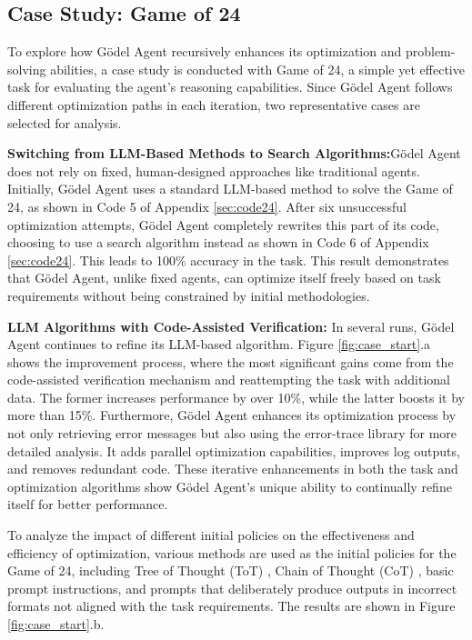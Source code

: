 \documentclass[11pt]{article}
\newcommand{\framework}{Gödel Agent\xspace}
\begin{document}
\subsection{Case Study: Game of 24}
\label{sec:game24}
To explore how \framework recursively enhances its optimization and problem-solving abilities, a case study is conducted with Game of 24, a simple yet effective task for evaluating the agent’s reasoning capabilities. Since \framework follows different optimization paths in each iteration, two representative cases are selected for analysis.



\noindent\textbf{Switching from LLM-Based Methods to Search Algorithms:}\quad \framework does not rely on fixed, human-designed approaches like traditional agents. Initially, \framework uses a standard LLM-based method to solve the Game of 24, as shown in Code 5 of Appendix \ref{sec:code24}. After six unsuccessful optimization attempts, \framework completely rewrites this part of its code, choosing to use a search algorithm instead as shown in Code 6 of Appendix \ref{sec:code24}. This leads to 100\% accuracy in the task. This result demonstrates that \framework, unlike fixed agents, can optimize itself freely based on task requirements without being constrained by initial methodologies.

\noindent\textbf{LLM Algorithms with Code-Assisted Verification:} \quad
In several runs, \framework continues to refine its LLM-based algorithm. Figure \ref{fig:case_start}.a shows the improvement process, where the most significant gains come from the code-assisted verification mechanism and reattempting the task with additional data. The former increases performance by over 10\%, while the latter boosts it by more than 15\%. Furthermore, \framework enhances its optimization process by not only retrieving error messages but also using the error-trace library for more detailed analysis. It adds parallel optimization capabilities, improves log outputs, and removes redundant code. These iterative enhancements in both the task and optimization algorithms show \framework{}’s unique ability to continually refine itself for better performance.

To analyze the impact of different initial policies on the effectiveness and efficiency of optimization, various methods are used as the initial policies for the Game of 24, including Tree of Thought (ToT) \citep{yao2023treethoughtsdeliberateproblem}, Chain of Thought (CoT) \citep{wei2022chain}, basic prompt instructions, and prompts that deliberately produce outputs in incorrect formats not aligned with the task requirements. The results are shown in Figure \ref{fig:case_start}.b.
\end{document}
